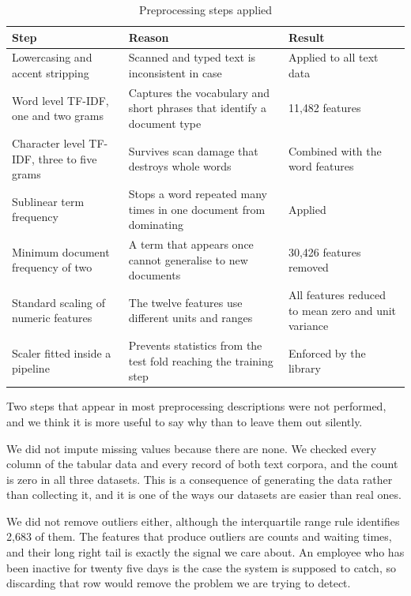 \documentclass[conference]{IEEEtran}
\begin{document}
\begin{table}[!t]
\centering
\caption{Preprocessing steps applied}
\footnotesize
\setlength{\tabcolsep}{3pt}
\begin{tabular}{p{}p{}p{}}
\toprule
\textbf{Step} & \textbf{Reason} & \textbf{Result} \\
\midrule
Lowercasing and accent stripping & Scanned and typed text is inconsistent in case & Applied to all text data \\
Word level TF-IDF, one and two grams & Captures the vocabulary and short phrases that identify a document type & 11,482 features \\
Character level TF-IDF, three to five grams & Survives scan damage that destroys whole words & Combined with the word features \\
Sublinear term frequency & Stops a word repeated many times in one document from dominating & Applied \\
Minimum document frequency of two & A term that appears once cannot generalise to new documents & 30,426 features removed \\
Standard scaling of numeric features & The twelve features use different units and ranges & All features reduced to mean zero and unit variance \\
Scaler fitted inside a pipeline & Prevents statistics from the test fold reaching the training step & Enforced by the library \\
\bottomrule
\end{tabular}
\end{table}

Two steps that appear in most preprocessing descriptions were not performed, and we think it is more useful to say why than to leave them out silently.

We did not impute missing values because there are none. We checked every column of the tabular data and every record of both text corpora, and the count is zero in all three datasets. This is a consequence of generating the data rather than collecting it, and it is one of the ways our datasets are easier than real ones.

We did not remove outliers either, although the interquartile range rule identifies 2,683 of them. The features that produce outliers are counts and waiting times, and their long right tail is exactly the signal we care about. An employee who has been inactive for twenty five days is the case the system is supposed to catch, so discarding that row would remove the problem we are trying to detect.
\end{document}

